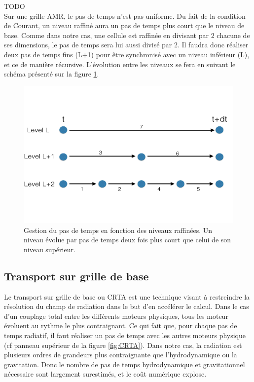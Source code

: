 TODO\\

Sur une grille \ac{AMR}, le pas de temps n'est pas uniforme.
Du fait de la condition de Courant, un niveau raffiné aura un pas de temps plus court que le niveau de base.
Comme dans notre cas, une cellule est raffinée en divisant par 2 chacune de ses dimensions, le pas de temps sera lui aussi divisé par 2.
Il faudra donc réaliser deux pas de temps fins (L+1) pour être synchronisé avec un niveau inférieur (L), et ce de manière récursive.
L'évolution entre les niveaux se fera en suivant le schéma présenté sur la figure \ref{fig:timestep}.

\begin{figure}
\includegraphics[width=.95\linewidth]{img/02/tstep.png}
\caption[Pas de temps AMR]{Gestion du pas de temps en fonction des niveaux raffinées.
Un niveau évolue par pas de temps deux fois plus court que celui de son niveau supérieur.
\label{fig:timestep}}
\end{figure}


\subsection{Transport sur grille de base}
\label{sec:crta}

Le transport sur grille de base ou \ac{CRTA} est une technique visant à restreindre la résolution du champ de radiation dans le but d'en accélérer le calcul.
Dans le cas d'un couplage total entre les différents moteurs physiques, tous les moteur évoluent au rythme le plus contraignant.
Ce qui fait que, pour chaque pas de temps radiatif, il faut réaliser un pas de temps avec les autres moteurs physique (cf panneau supérieur de la figure \ref{fig:CRTA}).
Dans notre cas, la radiation est plusieurs ordres de grandeurs plus contraignante que l'hydrodynamique ou la gravitation.
Donc le nombre de pas de temps hydrodynamique et gravitationnel nécessaire sont largement surestimés, et le coût numérique explose.

